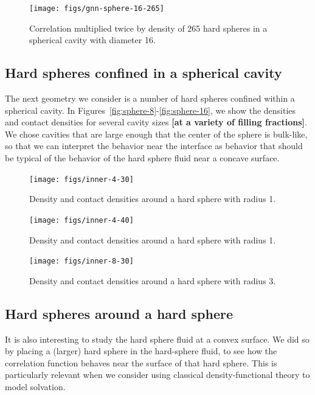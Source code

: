 \documentclass[letterpaper,twocolumn,amsmath,amssymb,jcp,10pt,aip]{revtex4-1}
\newcommand{\red}[1]{{\bf \color{red} #1}}
\newcommand{\fixme}[1]{\red{[#1]}}
\begin{document}
\begin{figure}
  \texttt{[image: figs/gnn-sphere-16-265]}
  \caption{Correlation multiplied twice by density of 265 hard spheres in a
    spherical cavity with diameter 16.}
  \label{fig:gnn-sphere-16-265}
\end{figure}


\subsection{Hard spheres confined in a spherical cavity}

The next geometry we consider is a number of hard spheres confined
within a spherical cavity.  In
Figures~\ref{fig:sphere-8}-\ref{fig:sphere-16}, we show the densities
and contact densities for several cavity sizes \fixme{at a variety of
  filling fractions}.  We chose cavities that are large enough that
the center of the sphere is bulk-like, so that we can interpret the
behavior near the interface as behavior that should be typical of the
behavior of the hard sphere fluid near a concave surface.



\begin{figure}
  \texttt{[image: figs/inner-4-30]}
  \caption{Density and contact densities around a hard sphere with
    radius 1.}
  \label{fig:inner-4-30}
\end{figure}

\begin{figure}
  \texttt{[image: figs/inner-4-40]}
  \caption{Density and contact densities around a hard sphere with
    radius 1.}
  \label{fig:inner-4-40}
\end{figure}

\begin{figure}
  \texttt{[image: figs/inner-8-30]}
  \caption{Density and contact densities around a hard sphere with
    radius 3.}
  \label{fig:inner-8-30}
\end{figure}

\subsection{Hard spheres around a hard sphere}

It is also interesting to study the hard sphere fluid at a convex
surface.  We did so by placing a (larger) hard sphere in the
hard-sphere fluid, to see how the correlation function behaves near
the surface of that hard sphere.  This is particularly relevant when
we consider using classical density-functional theory to model
solvation.
\end{document}

